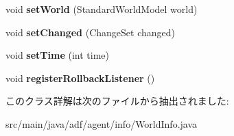 \begin{DoxyCompactItemize}
$$void {\bfseries set\+World} (Standard\+World\+Model world)
\item 
\hypertarget{classadf_1_1agent_1_1info_1_1WorldInfo_af196b26e724b0cc6743aaf7f05ff106b}{}\label{classadf_1_1agent_1_1info_1_1WorldInfo_af196b26e724b0cc6743aaf7f05ff106b} 
void {\bfseries set\+Changed} (Change\+Set changed)
\item 
\hypertarget{classadf_1_1agent_1_1info_1_1WorldInfo_a76748434bba4146dce4314c21bde11c6}{}\label{classadf_1_1agent_1_1info_1_1WorldInfo_a76748434bba4146dce4314c21bde11c6} 
void {\bfseries set\+Time} (int time)
\item 
\hypertarget{classadf_1_1agent_1_1info_1_1WorldInfo_adb9593963c7a5643f94a576fda1c4a85}{}\label{classadf_1_1agent_1_1info_1_1WorldInfo_adb9593963c7a5643f94a576fda1c4a85} 
void {\bfseries register\+Rollback\+Listener} ()
\end{DoxyCompactItemize}


このクラス詳解は次のファイルから抽出されました\+:\begin{DoxyCompactItemize}
\item 
src/main/java/adf/agent/info/World\+Info.\+java\end{DoxyCompactItemize}
